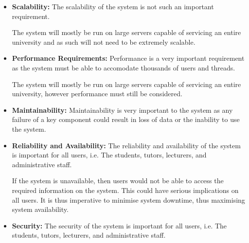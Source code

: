
\begin{flushleft}
	\begin{itemize}
		\item \textbf{Scalability:} 
The scalability of the system is not such an important requirement.
\newline

The system will mostly be run on large servers capable of servicing an entire university and as such will not need to be extremely scalable.
\newline

		\item \textbf{Performance Requirements:} 
Performance is a very important requirement as the system must be able to accomodate thousands of users and threads.
\newline

The system will mostly be run on large servers capable of servicing an entire university, however performance must still be considered.
\newline

		\item \textbf{Maintainability:} 
Maintainability is very important to the system as any failure of a key component could result in loss of data or the inability to use the system.
\newline

		\item \textbf{Reliability and Availability:} 
The reliability and availability of the system is important for all users, i.e. The students, tutors, lecturers, and administrative staff.
\newline

If the system is unavailable, then users would not be able to access the required information on the system. This could have serious implications on all users. It is thus imperative to minimise system downtime, thus maximising system availability.\newline	
		
		\item \textbf{Security:} 
The security of the system is important for all users, i.e. The students, tutors, lecturers, and administrative staff.
\newline


\end{itemize}
\end{flushleft}

